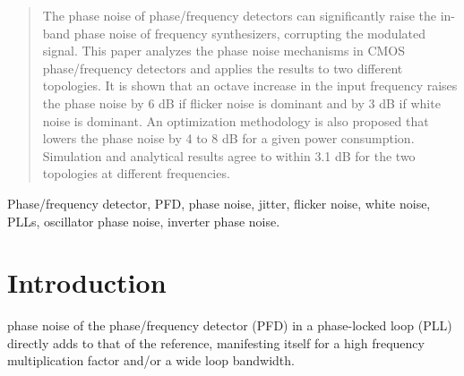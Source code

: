 \begin{abstract}
The phase noise of phase/frequency detectors can significantly raise the in-band phase noise of frequency synthesizers, corrupting the modulated
signal. This paper analyzes the phase noise mechanisms in CMOS phase/frequency detectors and applies the results to two different topologies. It is
shown that an octave increase in the input frequency raises the phase noise by 6 dB if flicker noise is dominant and by 3 dB if white noise is
dominant. An optimization methodology is also proposed that lowers the phase noise by 4 to 8 dB for a given power consumption. Simulation and
analytical results agree to within 3.1 dB for the two topologies at different frequencies.
\end{abstract}

\begin{IEEEkeywords}
Phase/frequency detector, PFD, phase noise, jitter, flicker noise, white noise, PLLs, oscillator phase noise, inverter phase noise.
\end{IEEEkeywords}






%
\IEEEpeerreviewmaketitle



\section{Introduction}
% 
% 
% 
% 
 phase noise of the phase/frequency detector (PFD) in a phase-locked loop (PLL) directly adds to that of the reference,
manifesting itself for a high frequency multiplication factor and/or a wide loop bandwidth.

